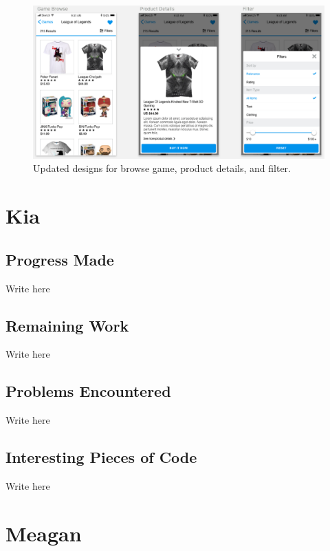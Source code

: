 \documentclass[onecolumn, draftclsnofoot,10pt, compsoc]{IEEEtran}
\begin{document}
\begin{figure}[H]
\centering
\captionsetup{justification=centering}
\includegraphics[scale=.50]{browse_game}
\caption{Updated designs for browse game, product details, and filter.}
\end{figure}

\section{Kia}
\subsection{Progress Made}
Write here
\subsection{Remaining Work}
Write here
\subsection{Problems Encountered}
Write here
\subsection{Interesting Pieces of Code}
Write here

\section{Meagan}
\end{document}
